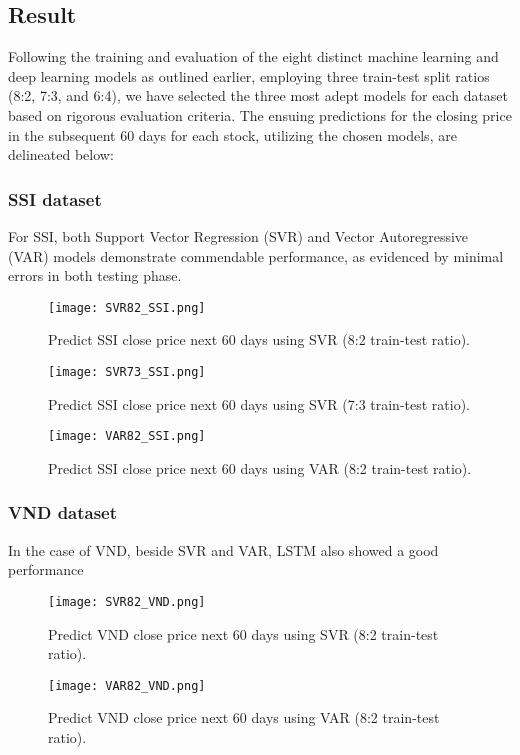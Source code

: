 \documentclass{ieeeojies}
\begin{document}
\subsection{Result}
Following the training and evaluation of the eight distinct machine learning and deep learning models as outlined earlier, employing three train-test split ratios (8:2, 7:3, and 6:4), we have selected the three most adept models for each dataset based on rigorous evaluation criteria. The ensuing predictions for the closing price in the subsequent 60 days for each stock, utilizing the chosen models, are delineated below:
\subsubsection{\textbf{SSI dataset}}
For SSI, both Support Vector Regression (SVR) and Vector Autoregressive (VAR) models demonstrate commendable performance, as evidenced by minimal errors in both testing phase.
\begin{figure}[H]
	\centering
	\texttt{[image: SVR82\_SSI.png]}
	\caption{Predict SSI close price next 60 days using SVR (8:2 train-test ratio).\centering}
	\label{fig1}
\end{figure}

\begin{figure}[H]
	\centering
	\texttt{[image: SVR73\_SSI.png]}
	\caption{Predict SSI close price next 60 days using SVR (7:3 train-test ratio).\centering}
	\label{fig1}
\end{figure}
\vspace*{-\baselineskip}
\begin{figure}[H]
	\centering
	\texttt{[image: VAR82\_SSI.png]}
	\caption{Predict SSI close price next 60 days using VAR (8:2 train-test ratio).\centering}
	\label{fig1}
\end{figure}

\subsubsection{\textbf{VND dataset}}
In the case of VND, beside SVR and VAR, LSTM also showed a good performance
\begin{figure}[H]
	\centering
	\texttt{[image: SVR82\_VND.png]}
	\caption{Predict VND close price next 60 days using SVR (8:2 train-test ratio).\centering}
	\label{fig1}
\end{figure}

\begin{figure}[H]
	\centering
	\texttt{[image: VAR82\_VND.png]}
	\caption{Predict VND close price next 60 days using VAR (8:2 train-test ratio).\centering}
	\label{fig1}
\end{figure}
\end{document}
